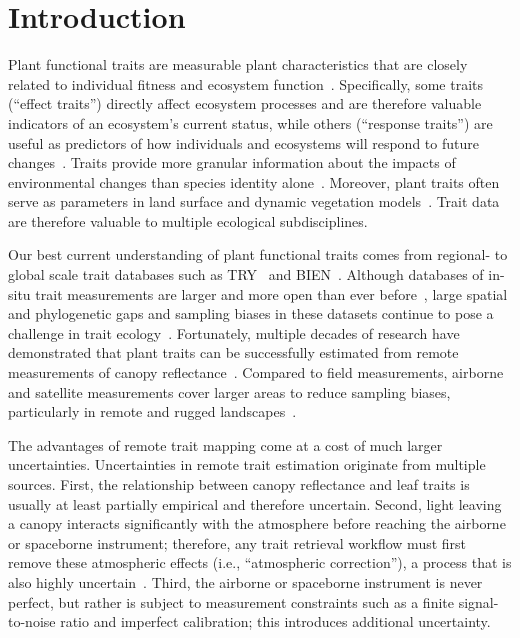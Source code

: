 \documentclass[draft]{agujournal2019}
\begin{document}
\section{Introduction}

Plant functional traits are measurable plant characteristics that are closely related to individual fitness and ecosystem function~\cite{violle2007let}.
Specifically, some traits (``effect traits'') directly affect ecosystem processes and are therefore valuable indicators of an ecosystem's current status, while others (``response traits'') are useful as predictors of how individuals and ecosystems will respond to future changes~\cite{lavorel2002predicting, funk2017revisiting}.
Traits provide more granular information about the impacts of environmental changes than species identity alone~\cite{cadotte2017should}.
Moreover, plant traits often serve as parameters in land surface and dynamic vegetation models~\cite{bonan_2012_reconciling, feng2013scale, harper2016improved, shiklomanov2020structure}.
Trait data are therefore valuable to multiple ecological subdisciplines.

Our best current understanding of plant functional traits comes from regional- to global scale trait databases such as TRY~\cite{kattge2020try} and BIEN~\cite{maitner2018bien}.
Although databases of in-situ trait measurements are larger and more open than ever before~\cite{kattge2020try}, large spatial and phylogenetic gaps and sampling biases in these datasets continue to pose a challenge in trait ecology~\cite{cornwell_2019_what}.
Fortunately, multiple decades of research have demonstrated that plant traits can be successfully estimated from remote measurements of canopy reflectance~\cite{cavender-bares2020remote, verrelst2019quantifying}.
Compared to field measurements, airborne and satellite measurements cover larger areas to reduce sampling biases, particularly in remote and rugged landscapes~\cite{jetz_2016_monitoring, marvin2014amazonian}.

The advantages of remote trait mapping come at a cost of much larger uncertainties.
Uncertainties in remote trait estimation originate from multiple sources.
First, the relationship between canopy reflectance and leaf traits is usually at least partially empirical and therefore uncertain.
Second, light leaving a canopy interacts significantly with the atmosphere before reaching the airborne or spaceborne instrument;
therefore, any trait retrieval workflow must first remove these atmospheric effects (i.e., ``atmospheric correction''), a process that is also highly uncertain~\cite{thompson2020quantifying}.
Third, the airborne or spaceborne instrument is never perfect, but rather is subject to measurement constraints such as a finite signal-to-noise ratio and imperfect calibration; this introduces additional uncertainty.
\end{document}
